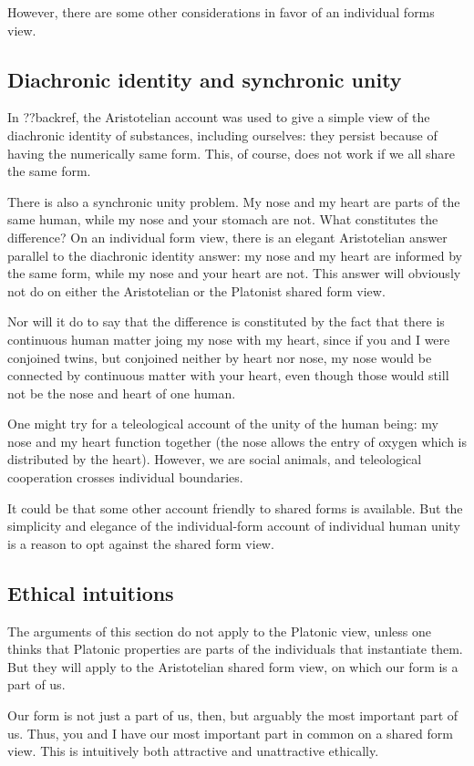 However, there are some other considerations in favor of an individual forms view.

\subsection{Diachronic identity and synchronic unity}
In ??backref, the Aristotelian account was used to give a simple view of the diachronic identity of substances,
including ourselves: they persist because of having the numerically same form. This, of course, does not work
if we all share the same form.

There is also a synchronic unity problem.
My nose and my heart are parts of the same human, while my nose and your stomach are not. What constitutes the 
difference? On an individual form view, there is an elegant Aristotelian answer parallel to the diachronic
identity answer: my nose and my heart are informed by the same
form, while my nose and your heart are not. This answer will obviously not do on either the Aristotelian or
the Platonist shared form view.

Nor will it do to say that the difference is constituted by the fact that there is continuous human matter joing my nose with my
heart, since if you and I were conjoined twins, but conjoined neither by heart nor nose, my nose would be connected by continuous
matter with your heart, even though those would still not be the nose and heart of one human. 

One might try for a teleological account of the unity of the human being: my nose and my heart function together (the nose 
allows the entry of oxygen which is distributed by the heart). However, we are social animals, and teleological cooperation
crosses individual boundaries.

It could be that some other account friendly to shared forms is available. But the simplicity and elegance of the
individual-form account of individual human unity is a reason to opt against the shared form view.

\subsection{Ethical intuitions}
The arguments of this section do not apply to the Platonic view, unless one thinks that Platonic
properties are parts of the individuals that instantiate them. But they will apply to the Aristotelian
shared form view, on which our form is a part of us. 

Our form is not just a part of us, then, but arguably the most important part of us. Thus, you and I 
have our most important part in common on a shared form view. This is intuitively both attractive and unattractive ethically. 

